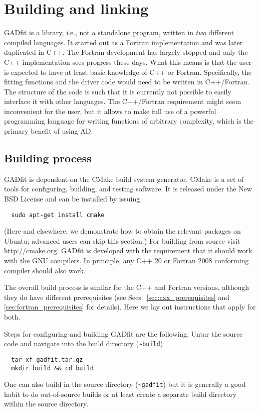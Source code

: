 \documentclass{article}
\begin{document}
\section{Building and linking}

GADfit is a library, i.e., not a standalone program, written in \textit{two} different compiled languages. It started out as a Fortran implementation and was later duplicated in C++. The Fortran development has largely stopped and only the C++ implementation sees progress these days. What this means is that the user is expected to have at least basic knowledge of C++ or Fortran. Specifically, the fitting functions and the driver code would need to be written in C++/Fortran. The structure of the code is such that it is currently not possible to easily interface it with other languages. The C++/Fortran requirement might seem inconvenient for the user, but it allows to make full use of a powerful programming language for writing functions of arbitrary complexity, which is the primary benefit of using AD.

\subsection{Building process}

GADfit is dependent on the CMake build system generator. CMake is a set of tools for configuring, building, and testing software. It is released under the New BSD License and can be installed by issuing
\begin{verbatim}
  sudo apt-get install cmake
\end{verbatim}
(Here and elsewhere, we demonstrate how to obtain the relevant packages on Ubuntu; advanced users can skip this section.) For building from source visit \url{http://cmake.org}. GADfit is developed with the requirement that it should work with the GNU compilers. In principle, any C++ 20 or Fortran 2008 conforming compiler should also work.

The overall build process is similar for the C++ and Fortran versions, although they do have different prerequisites (see Secs.~\ref{sec:cxx_prerequisites} and \ref{sec:fortran_prerequisites} for details). Here we lay out instructions that apply for both.

Steps for configuring and building GADfit are the following. Untar the source code and navigate into the build directory (\verb+~build+)
\begin{verbatim}
  tar xf gadfit.tar.gz
  mkdir build && cd build
\end{verbatim}
One can also build in the source directory (\verb+~gadfit+) but it is generally a good habit to do out-of-source builds or at least create a separate build directory within the source directory.
\end{document}
